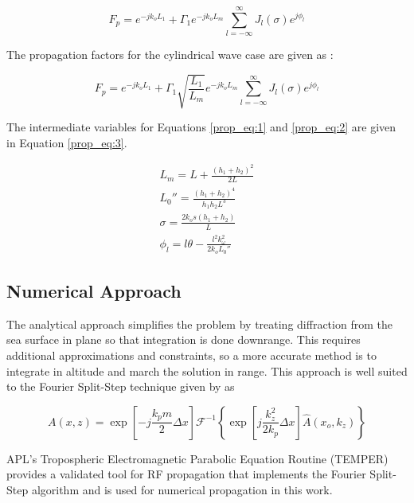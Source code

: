 \begin{equation}
F_p =e^{-jk_oL_1}+\Gamma_1 e^{-jk_oL_m} \sum_{l=-\infty}^{\infty}J_l(\sigma)e^{j\phi_l}
\label{prop_eq:1}
\end{equation}
\renewcommand{\baselinestretch}{2} \small\normalsize

\noindent The propagation factors for the cylindrical wave case are given as \cite{frazier_green}:

\begin{equation}
F_p =e^{-jk_oL_1}+\Gamma_1\sqrt{\frac{L_1}{L_m}} e^{-jk_oL_m} \sum_{l=-\infty}^{\infty}J_l(\sigma)e^{j\phi_l}
\label{prop_eq:2}
\end{equation}
\renewcommand{\baselinestretch}{2} \small\normalsize

\noindent The intermediate variables for Equations \ref{prop_eq:1} and \ref{prop_eq:2} are given in Equation \ref{prop_eq:3}.

\begin{equation}
\begin{gathered}
L_m = L + \frac{(h_1+h_2)^2}{2L} \\
L_0''=\frac{(h_1+h_2)^4}{h_1h_2L^3} \\
\sigma = \frac{2k_os(h_1+h_2)}{L} \\
\phi_l = l\theta - \frac{l^2k_{\omega}^2}{2k_oL_0''}
\label{prop_eq:3}
\end{gathered}
\end{equation}
\renewcommand{\baselinestretch}{2} \small\normalsize

\subsection{Numerical Approach}
The analytical approach simplifies the problem by treating diffraction from the sea surface in plane so that integration is done downrange. This requires additional approximations and constraints, so a more accurate method is to integrate in altitude and march the solution in range. This approach is well suited to the Fourier Split-Step technique given by \cite{frazier_green} as

\begin{equation}
A(x,z) = \exp\left[-j\frac{k_pm}{2}\Delta x\right]\mathcal{F}^{-1}\left\{\exp\left[j\frac{k_z^2}{2k_p}\Delta x \right]\hat{A}(x_o,k_z) \right\}
\label{prop_eq:4}
\end{equation}
\renewcommand{\baselinestretch}{2} \small\normalsize

APL's Tropospheric Electromagnetic Parabolic Equation Routine (TEMPER) \cite{temper_guide} provides a validated tool for RF propagation that implements the Fourier Split-Step algorithm and is used for numerical propagation in this work.


